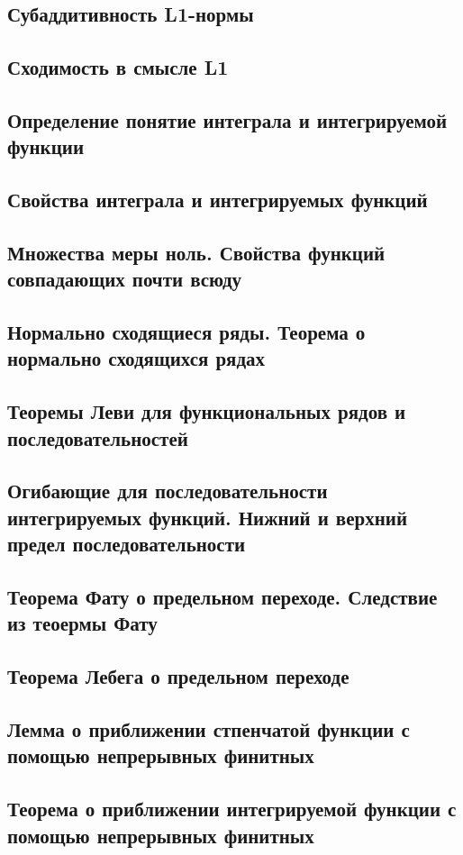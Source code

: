 \documentclass[a4paper]{article}
\theoremstyle{definition}
\theoremstyle{remark}
\begin{document}
    \subsection{ Субаддитивность L1-нормы}
    \subsection{ Сходимость в смысле L1}
    \subsection{ Определение понятие интеграла и интегрируемой функции}
    \subsection{ Свойства интеграла и интегрируемых функций}
    \subsection{ Множества меры ноль. Свойства функций совпадающих почти всюду}
    \subsection{ Нормально сходящиеся ряды. Теорема о нормально сходящихся рядах}
    \subsection{ Теоремы Леви для функциональных рядов и последовательностей}
    \subsection{ Огибающие для последовательности интегрируемых функций. Нижний и верхний предел последовательности}
    \subsection{ Теорема Фату о предельном переходе. Следствие из теоермы Фату}
    \subsection{ Теорема Лебега о предельном переходе}
    \subsection{ Лемма о приближении стпенчатой функции с помощью непрерывных финитных}
    \subsection{ Теорема о приближении интегрируемой функции с помощью непрерывных финитных}
\end{document}
